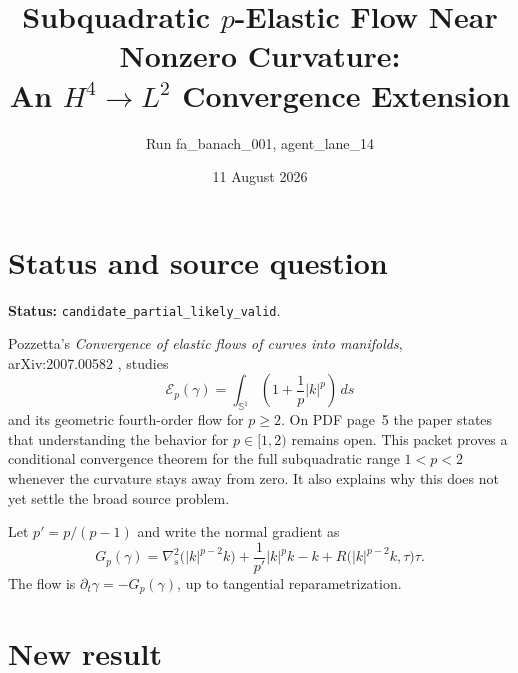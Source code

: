 \documentclass[11pt]{article}
\title{Subquadratic $p$-Elastic Flow Near Nonzero Curvature:\\
An $H^4\!\to L^2$ Convergence Extension}
\author{Run fa\_banach\_001, agent\_lane\_14}
\date{11 August 2026}
\newcommand{\E}{\mathcal E_p}
\newcommand{\Sone}{\mathbb S^1}
\begin{document}
\maketitle

\section*{Status and source question}

\textbf{Status:} \texttt{candidate\_partial\_likely\_valid}.

Pozzetta's \emph{Convergence of elastic flows of curves into manifolds},
arXiv:2007.00582 \cite{Pozzetta}, studies
\[
  \E(\gamma)=\int_{\Sone}\left(1+\frac1p|k|^p\right)\,ds
\]
and its geometric fourth-order flow for $p\ge2$.  On PDF page~5 the paper
states that understanding the behavior for $p\in[1,2)$ remains open.  This
packet proves a conditional convergence theorem for the full subquadratic
range $1<p<2$ whenever the curvature stays away from zero.  It also explains
why this does not yet settle the broad source problem.

Let $p'=p/(p-1)$ and write the normal gradient as
\begin{equation}\label{eq:gradient}
 G_p(\gamma)=\nabla_s^2\bigl(|k|^{p-2}k\bigr)
 +\frac1{p'}|k|^p k-k
 +R\bigl(|k|^{p-2}k,\tau\bigr)\tau .
\end{equation}
The flow is $\partial_t\gamma=-G_p(\gamma)$, up to tangential
reparametrization.

\section*{New result}
\end{document}
